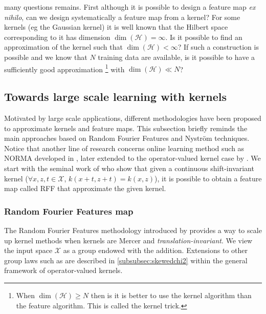 many questions remains. First although it is possible to design a feature map
\emph{ex nihilo}, can we design systematically a feature map from a kernel? For
some kernels (\acs{eg} the Gaussian kernel) it is well known that the Hilbert
space corresponding to it has dimension $\dim(\mathcal{H}) = \infty$. Is it
possible to find an approximation of the kernel such that $\dim(\mathcal{H}) <
\infty$? If such a construction is possible and we know that $N$ training data
are available, is it possible to have a sufficiently good approximation
\footnote{When $\dim(\mathcal{H}) \ge N$ then is it is better to use the kernel
algorithm than the feature algorithm. This is called the kernel trick.} with
$\dim(\mathcal{H}) \ll N$?

\subsection{Towards large scale learning with kernels}
Motivated by large scale applications, different methodologies have been
proposed to approximate kernels and feature maps. This subsection briefly
reminds the main approaches based on  Random Fourier Features and Nystr\"om
techniques. Notice that another line of research concerns online learning
method such as \acs{NORMA} developed in \cite{kivinen2004online}, later
extended to the operator-valued kernel case by \citet{audiffren2013online}.  We
start with the seminal work of \citet{Rahimi2007} who show that given a
continuous shift-invariant kernel ($\forall x, z, t \in \mathcal{X}$, $k(x + t,
z + t) = k(x, z)$), it is possible to obtain a feature map called \acs{RFF}
that approximate the given kernel.
\subsubsection{Random Fourier Features map}
The Random Fourier Features methodology introduced  by \citet{Rahimi2007}
provides a way to scale up kernel methods when kernels are Mercer and
\emph{translation-invariant}.  We view the input space $\mathcal{X}$ as a group
endowed with the addition. Extensions to other group laws such as
\citet{li2010random} are described in \cref{subsubsec:skewedchi2} within the
general framework of operator-valued kernels.
